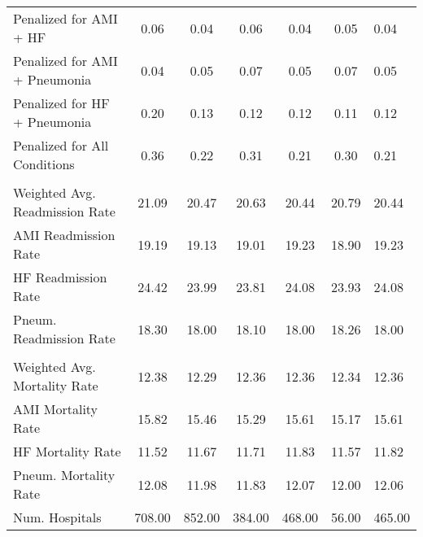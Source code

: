 \begin{table}[h]
\begin{tabular}[t]{lcccccl}
\hspace{1em}Penalized for AMI + HF & 0.06 & 0.04 & 0.06 & 0.04 & 0.05 & 0.04\\
\hspace{1em}Penalized for AMI + Pneumonia & 0.04 & 0.05 & 0.07 & 0.05 & 0.07 & 0.05\\
\hspace{1em}Penalized for HF + Pneumonia & 0.20 & 0.13 & 0.12 & 0.12 & 0.11 & 0.12\\
\hspace{1em}Penalized for All Conditions & 0.36 & 0.22 & 0.31 & 0.21 & 0.30 & 0.21\\
\addlinespace[0.3em]
\multicolumn{7}{l}{\textbf{Readmission Outcome Variables}}\\
\hspace{1em}Weighted Avg. Readmission Rate & 21.09 & 20.47 & 20.63 & 20.44 & 20.79 & 20.44\\
\hspace{1em}AMI Readmission Rate & 19.19 & 19.13 & 19.01 & 19.23 & 18.90 & 19.23\\
\hspace{1em}HF Readmission Rate & 24.42 & 23.99 & 23.81 & 24.08 & 23.93 & 24.08\\
\hspace{1em}Pneum. Readmission Rate & 18.30 & 18.00 & 18.10 & 18.00 & 18.26 & 18.00\\
\addlinespace[0.3em]
\multicolumn{7}{l}{\textbf{Mortality Outcome Variables}}\\
\hspace{1em}Weighted Avg. Mortality Rate & 12.38 & 12.29 & 12.36 & 12.36 & 12.34 & 12.36\\
\hspace{1em}AMI Mortality Rate & 15.82 & 15.46 & 15.29 & 15.61 & 15.17 & 15.61\\
\hspace{1em}HF Mortality Rate & 11.52 & 11.67 & 11.71 & 11.83 & 11.57 & 11.82\\
\hspace{1em}Pneum. Mortality Rate & 12.08 & 11.98 & 11.83 & 12.07 & 12.00 & 12.06\\
Num. Hospitals & 708.00 & 852.00 & 384.00 & 468.00 & 56.00 & 465.00\\
\bottomrule
\end{tabular}
\end{table}
